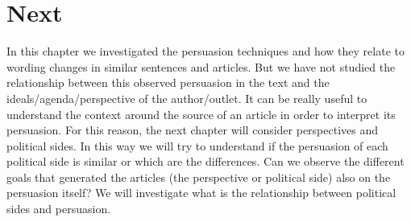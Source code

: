 \section{\statusgreen Next}
In this chapter we investigated the persuasion techniques and how they relate to wording changes in similar sentences and articles.
But we have not studied the relationship between this observed persuasion in the text and the ideals/agenda/perspective of the author/outlet.
It can be really useful to understand the context around the source of an article in order to interpret its persuasion.
For this reason, the next chapter will consider perspectives and political sides.
In this way we will try to understand if the persuasion of each political side is similar or which are the differences.
Can we observe the different goals that generated the articles (the perspective or political side) also on the persuasion itself? We will investigate what is the relationship between political sides and persuasion.
